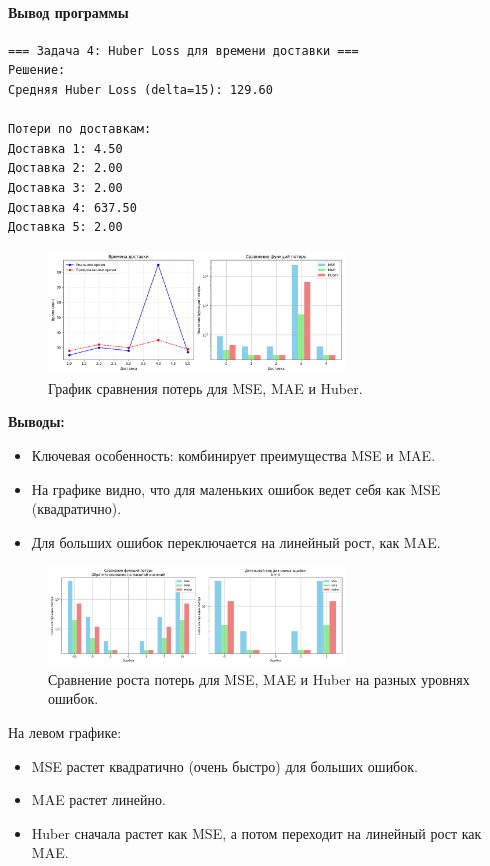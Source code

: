\documentclass[12pt]{article}
\theoremstyle{definition}
\theoremstyle{definition}
\theoremstyle{definition}
\theoremstyle{remark}
\theoremstyle{remark}
\begin{document}
\paragraph{Вывод программы}
\begin{verbatim}
=== Задача 4: Huber Loss для времени доставки ===
Решение:
Средняя Huber Loss (delta=15): 129.60

Потери по доставкам:
Доставка 1: 4.50
Доставка 2: 2.00
Доставка 3: 2.00
Доставка 4: 637.50
Доставка 5: 2.00
\end{verbatim}

\begin{figure}[h!]
    \centering
    \includegraphics[width=0.7\textwidth]{imgs/huber.png}
    \caption{График сравнения потерь для MSE, MAE и Huber.}
    \label{fig:huber_graph}
\end{figure}

\noindent\textbf{Выводы:}
\begin{itemize}
    \item Ключевая особенность: комбинирует преимущества MSE и MAE.
    \item На графике видно, что для маленьких ошибок ведет себя как MSE (квадратично).
    \item Для больших ошибок переключается на линейный рост, как MAE.
\end{itemize}

\begin{figure}[h!]
    \centering
    \includegraphics[width=0.7\textwidth]{imgs/huber_plus.png}
    \caption{Сравнение роста потерь для MSE, MAE и Huber на разных уровнях ошибок.}
    \label{fig:huber_plus}
\end{figure}

\noindent На левом графике:
\begin{itemize}
    \item MSE растет квадратично (очень быстро) для больших ошибок.
    \item MAE растет линейно.
    \item Huber сначала растет как MSE, а потом переходит на линейный рост как MAE.
\end{itemize}
\end{document}
